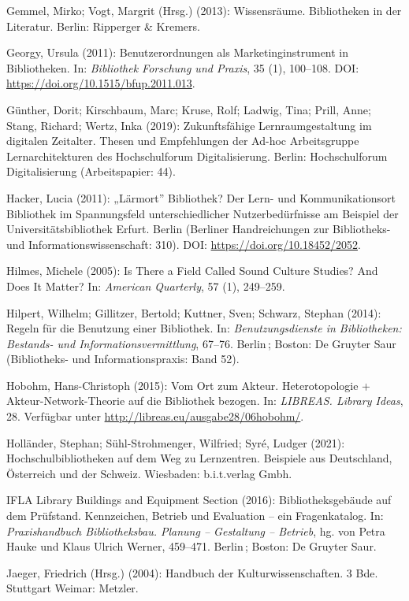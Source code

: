 \documentclass[a4paper,
fontsize=11pt,
oneside,
numbers=noperiodatend,
parskip=half-,
bibliography=totoc,
final
]{scrartcl}
\begin{document}
Gemmel, Mirko; Vogt, Margrit (Hrsg.) (2013): Wissensräume. Bibliotheken
in der Literatur. Berlin: Ripperger \& Kremers.

Georgy, Ursula (2011): Benutzerordnungen als Marketinginstrument in
Bibliotheken. In: \emph{Bibliothek Forschung und Praxis}, 35 (1),
100--108. DOI: \url{https://doi.org/10.1515/bfup.2011.013}.

Günther, Dorit; Kirschbaum, Marc; Kruse, Rolf; Ladwig, Tina; Prill,
Anne; Stang, Richard; Wertz, Inka (2019): Zukunftsfähige
Lernraumgestaltung im digitalen Zeitalter. Thesen und Empfehlungen der
Ad-hoc Arbeitsgruppe Lernarchitekturen des Hochschulforum
Digitalisierung. Berlin: Hochschulforum Digitalisierung (Arbeitspapier:
44).

Hacker, Lucia (2011): „Lärmort'' Bibliothek? Der Lern- und
Kommunikationsort Bibliothek im Spannungsfeld unterschiedlicher
Nutzerbedürfnisse am Beispiel der Universitätsbibliothek Erfurt. Berlin
(Berliner Handreichungen zur Bibliotheks- und Informationswissenschaft:
310). DOI: \url{https://doi.org/10.18452/2052}.

Hilmes, Michele (2005): Is There a Field Called Sound Culture Studies?
And Does It Matter? In: \emph{American Quarterly}, 57 (1), 249--259.

Hilpert, Wilhelm; Gillitzer, Bertold; Kuttner, Sven; Schwarz, Stephan
(2014): Regeln für die Benutzung einer Bibliothek. In:
\emph{Benutzungsdienste in Bibliotheken: Bestands- und
Informationsvermittlung}, 67--76. Berlin\,; Boston: De Gruyter Saur
(Bibliotheks- und Informationspraxis: Band 52).

Hobohm, Hans-Christoph (2015): Vom Ort zum Akteur. Heterotopologie +
Akteur-Network-Theorie auf die Bibliothek bezogen. In: \emph{LIBREAS.
Library Ideas}, 28. Verfügbar unter
\url{http://libreas.eu/ausgabe28/06hobohm/}.

Holländer, Stephan; Sühl-Strohmenger, Wilfried; Syré, Ludger (2021):
Hochschulbibliotheken auf dem Weg zu Lernzentren. Beispiele aus
Deutschland, Österreich und der Schweiz. Wiesbaden: b.i.t.verlag Gmbh.

IFLA Library Buildings and Equipment Section (2016): Bibliotheksgebäude
auf dem Prüfstand. Kennzeichen, Betrieb und Evaluation -- ein
Fragenkatalog. In: \emph{Praxishandbuch Bibliotheksbau. Planung --
Gestaltung -- Betrieb}, hg. von Petra Hauke und Klaus Ulrich Werner,
459--471. Berlin\,; Boston: De Gruyter Saur.

Jaeger, Friedrich (Hrsg.) (2004): Handbuch der Kulturwissenschaften. 3
Bde. Stuttgart Weimar: Metzler.
\end{document}
